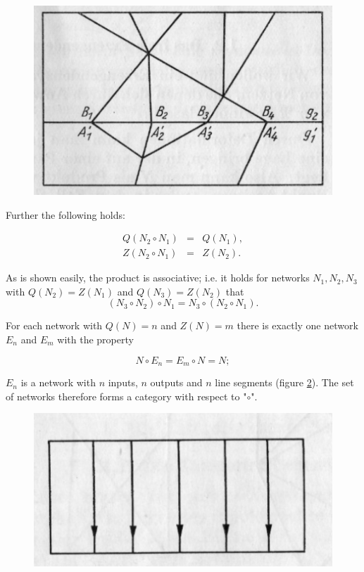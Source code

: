 \documentclass{article}
\begin{document}
\begin{figure}
\includegraphics[]{figure5.png}
  \centering
\caption{}
\label{fig:figure5}
\end{figure}

Further the following holds:

\[
\begin{array}{lcr}
Q(N_2 \circ N_1) & = & Q(N_1), \\
Z(N_2 \circ N_1) & = & Z(N_2).
\end{array}
\]

As is shown easily, the product is associative; i.e. it holds for networks $N_1, N_2, N_3$ with $Q(N_2) = Z(N_1)$ and $Q(N_3) = Z(N_2)$ that
\[ (N_3 \circ N_2) \circ N_1 = N_3 \circ (N_2 \circ N_1). \]

For each network with $Q(N) = n$ and $Z(N) = m$ there is exactly one network $E_n$ and $E_m$ with the property

\[
N\circ E_n = E_m \circ N = N;
\]

$E_n$ is a network with $n$ inputs, $n$ outputs and $n$ line segments (figure \ref{fig:figure6}). The set of networks therefore forms a category with respect to "$\circ$".

\begin{figure}
\includegraphics[]{figure6.png}
  \centering
\caption{}
\label{fig:figure6}
\end{figure}
\end{document}
